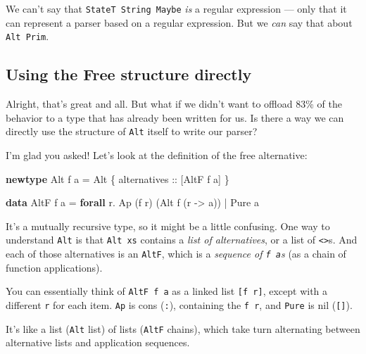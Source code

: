 \documentclass[]{article}
\newenvironment{Shaded}{}{}
\newcommand{\DataTypeTok}[1]{\textcolor[rgb]{0.56,0.13,0.00}{#1}}
\newcommand{\FunctionTok}[1]{\textcolor[rgb]{0.02,0.16,0.49}{#1}}
\newcommand{\KeywordTok}[1]{\textcolor[rgb]{0.00,0.44,0.13}{\textbf{#1}}}
\newcommand{\NormalTok}[1]{#1}
\newcommand{\OtherTok}[1]{\textcolor[rgb]{0.00,0.44,0.13}{#1}}
\begin{document}
We can't say that \texttt{StateT\ String\ Maybe} \emph{is} a regular expression
--- only that it can represent a parser based on a regular expression. But we
\emph{can} say that about \texttt{Alt\ Prim}.

\hypertarget{using-the-free-structure-directly}{%
\subsection{Using the Free structure
directly}\label{using-the-free-structure-directly}}

Alright, that's great and all. But what if we didn't want to offload 83\% of the
behavior to a type that has already been written for us. Is there a way we can
directly use the structure of \texttt{Alt} itself to write our parser?

I'm glad you asked! Let's look at the definition of the free alternative:

\begin{Shaded}
\begin{Highlighting}[]
\KeywordTok{newtype} \DataTypeTok{Alt}\NormalTok{ f a }\FunctionTok{=} \DataTypeTok{Alt}\NormalTok{ \{}\OtherTok{ alternatives ::}\NormalTok{ [}\DataTypeTok{AltF}\NormalTok{ f a] \}}

\KeywordTok{data} \DataTypeTok{AltF}\NormalTok{ f a }\FunctionTok{=} \KeywordTok{forall}\NormalTok{ r}\FunctionTok{.} \DataTypeTok{Ap}\NormalTok{ (f r) (}\DataTypeTok{Alt}\NormalTok{ f (r }\OtherTok{->}\NormalTok{ a))}
              \FunctionTok{|}           \DataTypeTok{Pure}\NormalTok{ a}
\end{Highlighting}
\end{Shaded}

It's a mutually recursive type, so it might be a little confusing. One way to
understand \texttt{Alt} is that \texttt{Alt\ xs} contains a \emph{list of
alternatives}, or a list of \texttt{\textless{}\textbar{}\textgreater{}}s. And
each of those alternatives is an \texttt{AltF}, which is a \emph{sequence of
\texttt{f\ a}s} (as a chain of function applications).

You can essentially think of \texttt{AltF\ f\ a} as a linked list
\texttt{{[}f\ r{]}}, except with a different \texttt{r} for each item.
\texttt{Ap} is cons (\texttt{:}), containing the \texttt{f\ r}, and
\texttt{Pure} is nil (\texttt{{[}{]}}).

It's like a list (\texttt{Alt} list) of lists (\texttt{AltF} chains), which take
turn alternating between alternative lists and application sequences.
\end{document}
